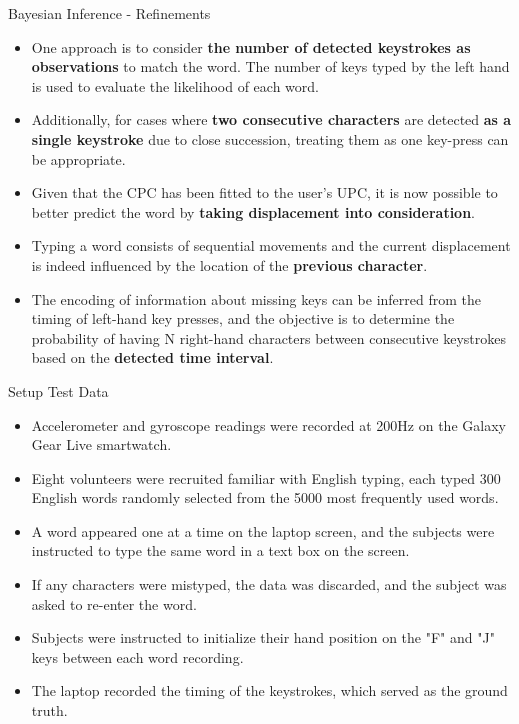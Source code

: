 \documentclass[ucs,9pt]{beamer}
\begin{document}
\begin{frame}{Bayesian Inference - Refinements}
	\begin{itemize}
		\item One approach is to consider \textbf{the number of detected keystrokes as observations} to match the word. The number of keys typed by the left hand is used to evaluate the likelihood of each word. 
		\item Additionally, for cases where\textbf{ two consecutive characters} are detected \textbf{as a single keystroke} due to close succession, treating them as one key-press can be appropriate. %
		
		\item Given that the CPC has been fitted to
		the user’s UPC, it is now possible to better predict the word by \textbf{taking displacement into consideration}. 
		\item Typing a word consists of sequential movements
		and the current displacement is indeed influenced by the location of the \textbf{previous character}. 
		\item The encoding of information about missing keys can be inferred from the timing of left-hand key presses, and the objective is to determine the probability of having N right-hand characters between consecutive keystrokes based on the \textbf{detected time interval}.
	\end{itemize}
\end{frame}

\begin{frame}{Setup Test Data}
\begin{itemize}
	\item Accelerometer and gyroscope readings were recorded at 200Hz on the Galaxy Gear Live smartwatch.
	\item 	Eight volunteers were recruited familiar with English typing, each typed 300 English words randomly selected from the 5000 most frequently used words. %
	\item A word appeared one at a time on the laptop screen, and the subjects were instructed to type the same word in a text box on the screen.
	\item If any characters were mistyped, the data was discarded, and the subject was asked to re-enter the word. 
	\item Subjects were instructed to initialize their hand position on the "F" and "J" keys between each word recording. 
	\item The laptop recorded the timing of the keystrokes, which served as the ground truth.
\end{itemize}
\end{frame}
\end{document}
